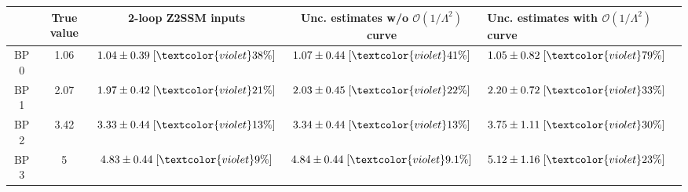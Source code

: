 \begin{tabular}{c||c|c|c}
 & True value & 2-loop Z2SSM inputs & Unc. estimates w/o $\mathcal{O}(1/\Lambda^2)$ curve & Unc. estimates with $\mathcal{O}(1/\Lambda^2)$ curve\\
\hline\hline
BP 0 & 1.06 & $1.04\pm0.39\;[\textcolor{violet}{38\%}]$ & $1.07\pm0.44\;[\textcolor{violet}{41\%}]$ & $1.05\pm0.82\;[\textcolor{violet}{79\%}]$\\\hline
BP 1 & 2.07 & $1.97\pm0.42\;[\textcolor{violet}{21\%}]$ & $2.03\pm0.45\;[\textcolor{violet}{22\%}]$ & $2.20\pm0.72\;[\textcolor{violet}{33\%}]$\\\hline
BP 2 & 3.42 & $3.33\pm0.44\;[\textcolor{violet}{13\%}]$ & $3.34\pm0.44\;[\textcolor{violet}{13\%}]$ & $3.75\pm1.11\;[\textcolor{violet}{30\%}]$\\\hline
BP 3 & 5 & $4.83\pm0.44\;[\textcolor{violet}{9\%}]$ & $4.84\pm0.44\;[\textcolor{violet}{9.1\%}]$ & $5.12\pm1.16\;[\textcolor{violet}{23\%}]$\\
\end{tabular}
